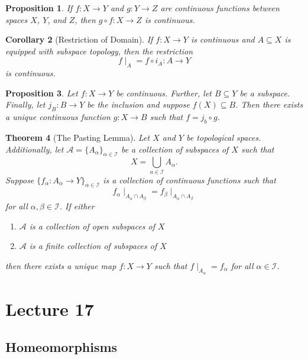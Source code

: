 \documentclass[ 12pt ]{article}
\newcounter{lecture_num}
\theoremstyle{plain}
\theoremstyle{plain}
\newtheorem{theorem}{Theorem}[lecture_num]
\newtheorem{proposition}[theorem]{Proposition}
\newtheorem{corollary}[theorem]{Corollary}
\theoremstyle{definition}
\theoremstyle{remark}
\begin{document}
\begin{proposition}
	If $f : X \to Y$ and $g : Y \to Z$ are continuous functions between spaces $X$, $Y$, and $Z$, then $g \circ f : X \to Z$ is continuous.
\end{proposition}

\begin{corollary}[Restriction of Domain]
	If $f : X \to Y$ is continuous and $A \subseteq X$ is equipped with subspace topology, then the restriction $$f \mid_A = f \circ i_A : A \to Y$$ is continuous.
\end{corollary}

\begin{proposition}
	Let $f : X \to Y$ be continuous. Further, let $B \subseteq Y$ be a subspace. Finally, let $j_B : B \to Y$ be the inclusion and suppose $f(X) \subseteq B$. Then there exists a unique
	continuous function $g : X \to B$ such that $f = j_b \circ g$.
\end{proposition}

\begin{theorem}[The Pasting Lemma]
	Let $X$ and $Y$ be topological spaces. Additionally, let $\mathcal{A} = \{ A_\alpha \}_{\alpha \in \mathcal{I}}$ be a collection of subspaces of $X$ such that $$X = \bigcup_{a \in
	\mathcal{I}} A_\alpha.$$ Suppose $\{ f_\alpha : A_\alpha \to Y \}_{\alpha \in \mathcal{I}}$ is a collection of continuous functions such that $$f_\alpha \mid_{A_\alpha \cap A_\beta}
	= f_\beta \mid_{A_\alpha \cap A_\beta}$$ for all $\alpha, \beta \in \mathcal{I}$.
	If either
	\begin{enumerate}
		\item[i.] $\mathcal{A}$ is a collection of open subspaces of $X$
		\item[ii.] $\mathcal{A}$ is a finite collection of subspaces of $X$
	\end{enumerate}
	then there exists a unique map $f : X \to Y$ such that $f \mid_{A_\alpha} = f_\alpha$ for all $\alpha \in \mathcal{I}$.
\end{theorem}


\setcounter{lecture_num}{17}
\setcounter{theorem}{0}
\section*{Lecture 17}

\subsection*{Homeomorphisms}
\end{document}
